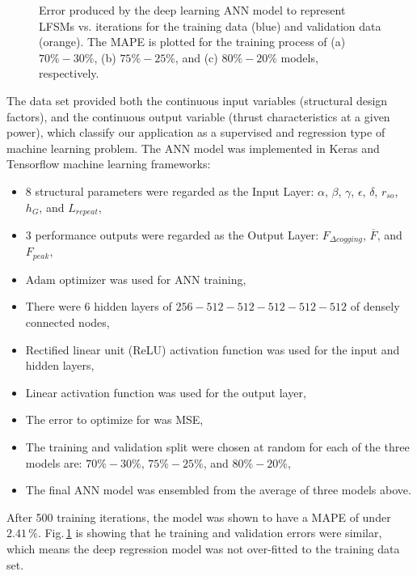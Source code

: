 \begin{figure}
{                    \label{fig:chapter/rsm/LFSM/training result/MAPE_80_20}
                }
                \caption{
                    Error produced by the deep learning ANN model to represent \acsp{LFSM} vs. iterations for the training data (blue) and validation data (orange). The \acs{MAPE} is plotted for the training process of (a) $70\%-30\%$, (b) $75\%-25\%$, and (c) $80\%-20\%$ models, respectively.
                }   \label{fig:chapter/rsm/LFSM/training result}
            \end{figure}
        
        
            The data set provided both the continuous input variables (structural design factors), and the continuous output variable (thrust characteristics at a given power), which classify our application as a supervised and regression type of machine learning problem. The \acs{ANN} model was implemented in Keras and Tensorflow machine learning frameworks:

            
            \begin{itemize}
                \item $8$ structural parameters were regarded as the Input Layer: $\alpha$, $\beta$, $\gamma$, $\epsilon$, $\delta$, $r_{so}$, $h_G$, and $L_{repeat}$,
                \item $3$ performance outputs were regarded as the Output Layer: $F_{\Delta cogging}$, $\overline{F}$, and $F_{peak}$,
                \item $\mathrm{Adam}$ optimizer was used for \acs{ANN} training,
                \item There were $6$ hidden layers of $256-512-512-512-512-512$ of densely connected nodes,
                \item Rectified linear unit (ReLU) activation function was used
for the input and hidden layers,
                \item Linear activation function was used for the output layer,
                \item The error to optimize for was \acs{MSE},
                \item The training and validation split were chosen at random for each of the three models are: $70\%-30\%$, $75\%-25\%$, and $80\%-20\%$,
                \item The final \acs{ANN} model was ensembled from the average of three models above.
            \end{itemize}


            After 500 training iterations, the model was shown to have a \acf{MAPE} of under $2.41\,\%$. Fig.\,\ref{fig:chapter/rsm/LFSM/training result} is showing that he training and validation errors were similar, which means the deep regression model was not over-fitted to the training data set.
        
